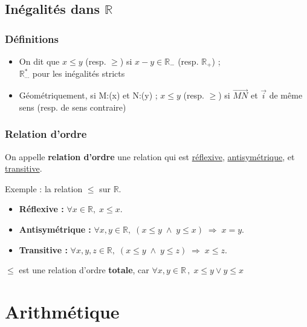 \documentclass{report}
\newcommand{\R}{\mathbb{R}}
\begin{document}
    \subsection{Inégalités dans $\R$}

      \subsubsection{Définitions}

        \begin{itemize}[label=$\rightarrow$]
          \item On dit que $x\le y $ (resp. $\ge$) si $x-y\in\R_-$ (resp. $\R_+$) ; \\ $\R^*_{\cdots}$ pour les inégalités stricts
          \item Géométriquement, si M:(x) et N:(y) ;  $x\le y $ (resp. $\ge$) si $\overrightarrow{MN}$ et $\vec{i}$ de même sens (resp. de sens contraire)
        \end{itemize}

        \subsubsection{Relation d'ordre}

          On appelle \textbf{relation d'ordre} une relation qui est \underline{réflexive}, \underline{antisymétrique}, et \underline{transitive}.
          
          Exemple : la relation \(\le\) sur \(\mathbb{R}\).
          
          \begin{itemize}
            \item \textbf{Réflexive : } \(\forall x \in \mathbb{R}, \; x \leq x\).
            \item \textbf{Antisymétrique : } \(\forall x,y \in \mathbb{R}, \; (x \leq y \;\wedge\; y \leq x) \;\Rightarrow\; x=y\).
            \item \textbf{Transitive : } \(\forall x,y,z \in \mathbb{R}, \; (x \leq y \;\wedge\; y \leq z) \;\Rightarrow\; x \leq z\).
          \end{itemize}

          $\le$ est une relation d'ordre \textbf{totale}, car $\forall x,y\in \R \, , \; x\le y \lor y\le x$


  \newpage

  \section{Arithmétique}
\end{document}
